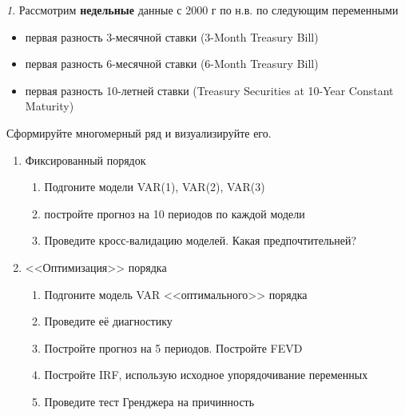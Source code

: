 \documentclass[12pt]{article}
\theoremstyle{remark}
\newtheorem{exercise}{}[subsection]
\begin{document}
\begin{exercise}
Рассмотрим \textbf{недельные} данные с 2000 г по н.в. по следующим переменными
\begin{itemize}
	\item первая разность 3-месячной ставки (3-Month Treasury Bill)
	\item первая разность 6-месячной ставки (6-Month Treasury Bill)
	\item первая разность 10-летней ставки (Treasury Securities at 10-Year Constant Maturity)
\end{itemize}
Сформируйте многомерный ряд и визуализируйте его.
\begin{enumerate}
	\item Фиксированный порядок
	\begin{enumerate}
		\item Подгоните модели VAR(1), VAR(2), VAR(3)
		\item постройте прогноз на 10 периодов по каждой модели
		\item Проведите кросс-валидацию моделей. Какая предпочтительней?
	\end{enumerate}
	\item <<Оптимизация>> порядка
	\begin{enumerate}
		\item Подгоните модель VAR <<оптимального>> порядка
		\item Проведите её диагностику
		\item Постройте прогноз на 5 периодов. Постройте FEVD
		\item Постройте IRF, использую исходное упорядочивание переменных
		\item Проведите тест Гренджера на причинность
	\end{enumerate}
\end{enumerate}
\end{exercise}
\end{document}
